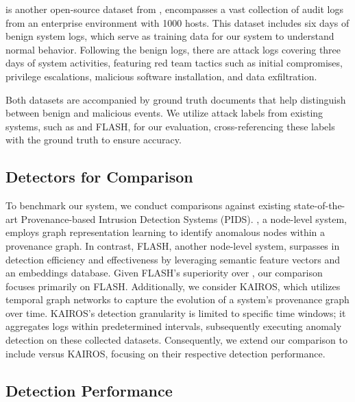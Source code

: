 \optc is another open-source dataset from \darpa, encompasses a vast collection of audit logs from an enterprise environment with 1000 hosts. This dataset includes six days of benign system logs, which serve as training data for our system to understand normal behavior. Following the benign logs, there are attack logs covering three days of system activities, featuring red team tactics such as initial compromises, privilege escalations, malicious software installation, and data exfiltration.

Both datasets are accompanied by ground truth documents that help distinguish between benign and malicious events. We utilize attack labels from existing systems, such as \threatrace and FLASH, for our evaluation, cross-referencing these labels with the ground truth to ensure accuracy.


\subsection{Detectors for Comparison}


To benchmark our system, we conduct comparisons against existing state-of-the-art Provenance-based Intrusion Detection Systems (PIDS). \threatrace, a node-level system, employs graph representation learning to identify anomalous nodes within a provenance graph. In contrast, FLASH, another node-level system, surpasses \threatrace in detection efficiency and effectiveness by leveraging semantic feature vectors and an embeddings database. Given FLASH's superiority over \threatrace, our comparison focuses primarily on FLASH. Additionally, we consider KAIROS, which utilizes temporal graph networks to capture the evolution of a system's provenance graph over time. KAIROS's detection granularity is limited to specific time windows; it aggregates logs within predetermined intervals, subsequently executing anomaly detection on these collected datasets. Consequently, we extend our comparison to include \Sys versus KAIROS, focusing on their respective detection performance.

 \subsection{Detection Performance}

